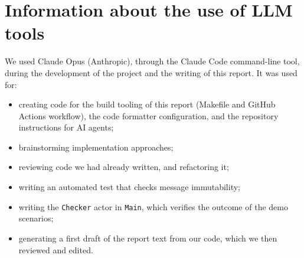 \section*{Information about the use of LLM tools}

We used Claude Opus (Anthropic), through the Claude Code command-line tool, during the development of the project and the writing of this report. It was used for:

\begin{itemize}[nosep]
    \item creating code for the build tooling of this report (Makefile and GitHub Actions workflow), the code formatter configuration, and the repository instructions for AI agents;
    \item brainstorming implementation approaches;
    \item reviewing code we had already written, and refactoring it;
    \item writing an automated test that checks message immutability;
    \item writing the \texttt{Checker} actor in \texttt{Main}, which verifies the outcome of the demo scenarios;
    \item generating a first draft of the report text from our code, which we then reviewed and edited.
\end{itemize}

